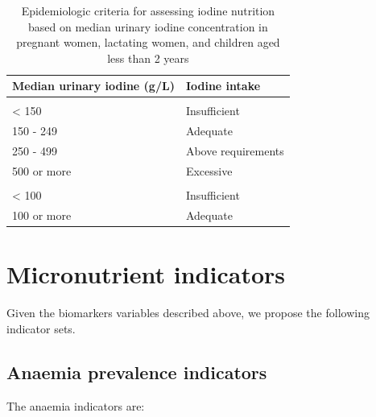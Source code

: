 \documentclass[12pt,a4paper]{article}
\begin{document}
\begin{table}[H]

\caption{\label{tab:iodine2}Epidemiologic criteria for assessing iodine nutrition based on median urinary iodine concentration in pregnant women, lactating women, and children aged less than 2 years}
\centering
\begin{tabular}[t]{ll}
\toprule
\textbf{Median urinary iodine (g/L)} & \textbf{Iodine intake}\\
\midrule
\rowcolor{gray!6}  \addlinespace[0.3em]
\multicolumn{2}{l}{\textbf{Pregnant women}}\\
\hspace{1em}< 150 & Insufficient\\
\hspace{1em}150 - 249 & Adequate\\
\rowcolor{gray!6}  \hspace{1em}250 - 499 & Above requirements\\
\hspace{1em}500 or more & Excessive\\
\rowcolor{gray!6}  \addlinespace[0.3em]
\multicolumn{2}{l}{\textbf{Lactating women and children aged less than 2 years}}\\
\hspace{1em}< 100 & Insufficient\\
\hspace{1em}100 or more & Adequate\\
\bottomrule
\end{tabular}
\end{table}

\hypertarget{micronutrient-indicators}{%
\section{Micronutrient indicators}\label{micronutrient-indicators}}

Given the biomarkers variables described above, we propose the following indicator sets.

\hypertarget{anaemia-prevalence-indicators}{%
\subsection{Anaemia prevalence indicators}\label{anaemia-prevalence-indicators}}

The anaemia indicators are:
\end{document}
